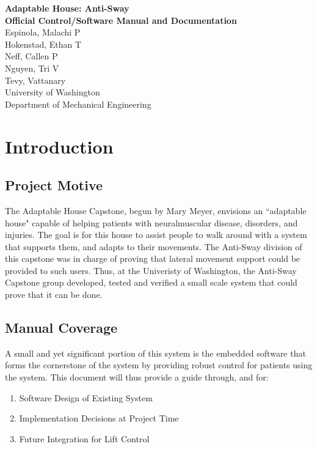 \documentclass[letterpaper]{article}
\begin{document}
\begin{titlepage}
    \begin{center}
       \Large\textbf{Adaptable House: Anti-Sway} \\
       \Large\textbf{Official Control/Software Manual and Documentation} \\
       \large{Espinola, Malachi P} \\
       \large{Hokenstad, Ethan T} \\
       \large{Neff, Callen P} \\
       \large{Nguyen, Tri V} \\
       \large{Tevy, Vattanary} \\
       \Large{University of Washington} \\
       \Large{Department of Mechanical Engineering} \\
    \end{center}
\end{titlepage}

\newpage

\tableofcontents

\newpage

\section{Introduction}
\subsection{Project Motive}
The Adaptable House Capstone, begun by Mary Meyer, envisions an ``adaptable house" capable of helping patients with neuralmuscular disease, disorders, and injuries. The goal is for this house to assist people to walk around with a system that supports them, and adapts to their movements. The Anti-Sway division of this capstone was in charge of proving that lateral movement support could be provided to such users. Thus, at the Univeristy of Washington, the Anti-Sway Capstone group developed, tested and verified a small scale system that could prove that it can be done. 
\subsection{Manual Coverage}
A small and yet significant portion of this system is the embedded software that forms the cornerstone of the system by providing robust control for patients using the system. This document will thus provide a guide through, and for:
\begin{enumerate}
    \item Software Design of Existing System
    \item Implementation Decisions at Project Time
    \item Future Integration for Lift Control
\end{enumerate}
\end{document}
